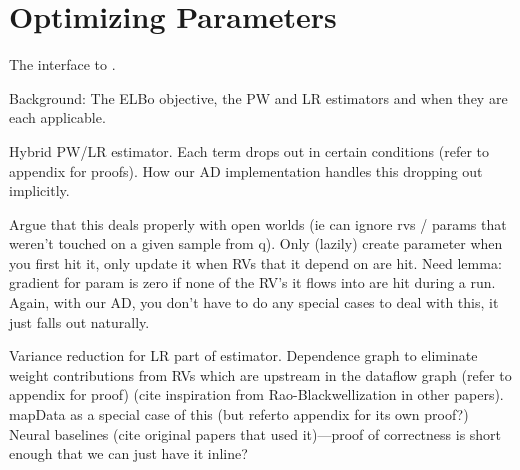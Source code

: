 \section{Optimizing Parameters}
\label{sec:optimization}

The interface to .

Background: The ELBo objective, the PW and LR estimators and when they are each applicable.

Hybrid PW/LR estimator. Each term drops out in certain conditions (refer to appendix for proofs). How our AD implementation handles this dropping out implicitly.

Argue that this deals properly with open worlds (ie can ignore rvs / params that weren’t touched on a given sample from q). Only (lazily) create parameter when you first hit it, only update it when RVs that it depend on are hit. Need lemma: gradient for param is zero if none of the RV’s it flows into are hit during a run. Again, with our AD, you don’t have to do any special cases to deal with this, it just falls out naturally.

Variance reduction for LR part of estimator. Dependence graph to eliminate weight contributions from RVs which are upstream in the dataflow graph (refer to appendix for proof) (cite inspiration from Rao-Blackwellization in other papers). mapData as a special case of this (but referto appendix for its own proof?) Neural baselines (cite original papers that used it)---proof of correctness is short enough that we can just have it inline?

